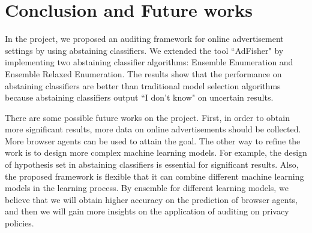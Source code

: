 \documentclass[12pt, journal]{IEEEtran}
\begin{document}
\section{Conclusion and Future works}
In the project, we proposed an auditing framework for online advertisement settings by using abstaining classifiers.
We extended the tool ``AdFisher" by implementing two abstaining classifier algorithms: Ensemble Enumeration and Ensemble Relaxed Enumeration.
The results show that the performance on abstaining classifiers are better than traditional model selection algorithms because abstaining classifiers output ``I don't know" on uncertain results.

There are some possible future works on the project.
First, in order to obtain more significant results, more data on online advertisements should be collected.
More browser agents can be used to attain the goal.
The other way to refine the work is to design more complex machine learning models.
For example, the design of hypothesis set in abstaining classifiers is essential for significant results.
Also, the proposed framework is flexible that it can combine different machine learning models in the learning process.
By ensemble for different learning models, we believe that we will obtain higher accuracy on the prediction of browser agents, and then we will gain more insights on the application of auditing on privacy policies.  


%
\end{document}
